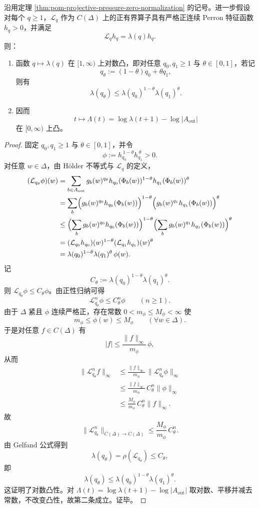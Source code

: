 \begin{theorem}\label{thm:pom-projective-pressure-holder-logconvex}
沿用定理 \ref{thm:pom-projective-pressure-zero-normalization} 的记号。进一步假设对每个 \(q\ge 1\)，\(\mathcal{L}_q\) 作为 \(C(\Delta)\) 上的正有界算子具有严格正连续 Perron 特征函数 \(h_q>0\)，并满足
\[
\mathcal{L}_q h_q=\lambda(q)h_q.
\]
则：
\begin{enumerate}
  \item 函数 \(q\mapsto \lambda(q)\) 在 \([1,\infty)\) 上对数凸，即对任意 \(q_0,q_1\ge 1\) 与 \(\theta\in[0,1]\)，若记
  \[
  q_\theta:=(1-\theta)q_0+\theta q_1,
  \]
  则有
  \[
  \boxed{\;
  \lambda(q_\theta)
  \le
  \lambda(q_0)^{1-\theta}\lambda(q_1)^\theta.\;}
  \]
  \item 因而
  \[
  t\longmapsto \Lambda(t)=\log\lambda(t+1)-\log|A_{\mathrm{out}}|
  \]
  在 \([0,\infty)\) 上凸。
\end{enumerate}
\end{theorem}
\begin{proof}
固定 \(q_0,q_1\ge 1\) 与 \(\theta\in[0,1]\)，并令
\[
\phi:=h_{q_0}^{\,1-\theta}h_{q_1}^{\,\theta}>0.
\]
对任意 \(w\in\Delta\)，由 Hölder 不等式与 \(\mathcal{L}_q\) 的定义，
\[
\begin{aligned}
(\mathcal{L}_{q_\theta}\phi)(w)
&=
\sum_{b\in A_{\mathrm{out}}}
g_b(w)^{q_\theta}
h_{q_0}(\Phi_b(w))^{1-\theta}
h_{q_1}(\Phi_b(w))^\theta\\
&=
\sum_b
\Bigl(g_b(w)^{q_0}h_{q_0}(\Phi_b(w))\Bigr)^{1-\theta}
\Bigl(g_b(w)^{q_1}h_{q_1}(\Phi_b(w))\Bigr)^\theta\\
&\le
\Bigl(\sum_b g_b(w)^{q_0}h_{q_0}(\Phi_b(w))\Bigr)^{1-\theta}
\Bigl(\sum_b g_b(w)^{q_1}h_{q_1}(\Phi_b(w))\Bigr)^\theta\\
&=
(\mathcal{L}_{q_0}h_{q_0})(w)^{1-\theta}
(\mathcal{L}_{q_1}h_{q_1})(w)^\theta\\
&=
\lambda(q_0)^{1-\theta}\lambda(q_1)^\theta\,\phi(w).
\end{aligned}
\]
记
\[
C_\theta:=\lambda(q_0)^{1-\theta}\lambda(q_1)^\theta.
\]
则 \(\mathcal{L}_{q_\theta}\phi\le C_\theta\phi\)。由正性归纳可得
\[
\mathcal{L}_{q_\theta}^n\phi\le C_\theta^n\phi
\qquad(n\ge 1).
\]
由于 \(\Delta\) 紧且 \(\phi\) 连续严格正，存在常数 \(0<m_\phi\le M_\phi<\infty\) 使
\[
m_\phi\le \phi(w)\le M_\phi
\qquad(\forall w\in\Delta).
\]
于是对任意 \(f\in C(\Delta)\) 有
\[
|f|\le \frac{\|f\|_\infty}{m_\phi}\,\phi,
\]
从而
\[
\begin{aligned}
\|\mathcal{L}_{q_\theta}^n f\|_\infty
&\le
\frac{\|f\|_\infty}{m_\phi}\,
\|\mathcal{L}_{q_\theta}^n\phi\|_\infty\\
&\le
\frac{\|f\|_\infty}{m_\phi}\,C_\theta^n\|\phi\|_\infty\\
&\le
\frac{M_\phi}{m_\phi}\,C_\theta^n\|f\|_\infty.
\end{aligned}
\]
故
\[
\|\mathcal{L}_{q_\theta}^n\|_{C(\Delta)\to C(\Delta)}
\le
\frac{M_\phi}{m_\phi}\,C_\theta^n.
\]
由 Gelfand 公式得到
\[
\lambda(q_\theta)=\rho(\mathcal{L}_{q_\theta})\le C_\theta,
\]
即
\[
\lambda(q_\theta)\le \lambda(q_0)^{1-\theta}\lambda(q_1)^\theta.
\]
这证明了对数凸性。对 \(\Lambda(t)=\log\lambda(t+1)-\log|A_{\mathrm{out}}|\) 取对数、平移并减去常数，不改变凸性，故第二条成立。证毕。
\end{proof}

